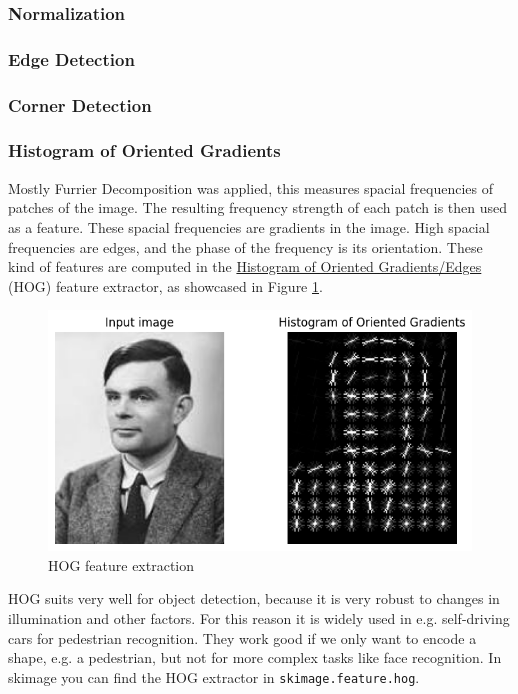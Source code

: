 \subsubsection{Normalization}
\subsubsection{Edge Detection}
\subsubsection{Corner Detection}
\subsubsection{Histogram of Oriented Gradients}
Mostly Furrier Decomposition was applied, this measures spacial frequencies of patches of the image.
The resulting frequency strength of each patch is then used as a feature.
These spacial frequencies are gradients in the image. High spacial frequencies are edges,
and the phase of the frequency is its orientation.
These kind of features are computed in the \underline{Histogram of Oriented Gradients/Edges} (HOG) feature extractor, as showcased in 
Figure \ref{fig:hog}.

\begin{figure}[h]
  \centering
  \includegraphics[width=.95\textwidth]{images/hog.png}
  \caption{HOG feature extraction}
  \label{fig:hog}
\end{figure}

HOG suits very well for object detection, because it is very robust to changes in illumination and other factors.
For this reason it is widely used in e.g. self-driving cars for pedestrian recognition.
They work good if we only want to encode a shape, e.g. a pedestrian, but not for more complex tasks like face recognition.
In skimage you can find the HOG extractor in \lstinline{skimage.feature.hog}.
